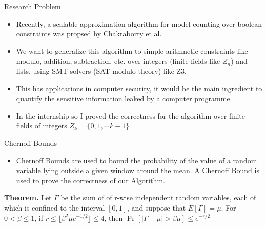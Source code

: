 \documentclass[final]{beamer}
\newlength{\colwidth}
\begin{document}
\begin{frame}[t]
\begin{columns}[t]
\begin{column}{\colwidth}
  \begin{block}{Research Problem}
    	\begin{itemize}
     
		\item Recently, a scalable approximation algorithm for model counting over boolean constraints was propsed by Chakraborty et al.
		\item We want to generalize this algorithm to simple arithmetic constraints like modulo, addition, subtraction, etc. over integers (finite fields like $Z_n$) and lists, using SMT solvers (SAT modulo theory) like Z3.
		\item This has applications in computer security, it would be the main ingredient to quantify the sensitive information leaked by a computer programme.
        \item In the internship so I proved the correctness for the algorithm over finite fields of integers $Z_k=\{0,1,\cdots k - 1\}$
	\end{itemize}




  \end{block}

  \begin{block}{Chernoff Bounds}
  \begin{itemize}
      \item Chernoff Bounds are used to bound the probability of the value of a random variable lying outside a given window around the mean. A Chernoff Bound is used to prove the correctness of our Algorithm.
  \end{itemize}
	\textbf{Theorem. }Let $\Gamma$ be the sum of of r-wise independent random variables, each of
	which is conﬁned to the interval $[0,1]$, and suppose that $E[\Gamma] = \mu$. For $0 < \beta 
	\leq 1$, if $r \leq \lfloor \beta^2 \mu e^{-1/2} \rfloor \leq 4$, then $\Pr[|\Gamma - \mu| > \beta \mu] \leq e^{-r/2} $


\end{block}
\end{column}
\end{columns}
\end{frame}
\end{document}
